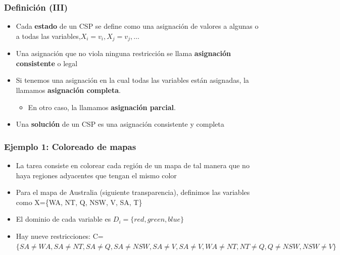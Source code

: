 \documentclass[xcolor=table]{beamer}
\begin{document}
\begin{frame}  \frametitle{Definición (III)} \footnotesize

\begin{itemize}
\item Cada \textbf{estado} de un CSP se define como una asignación de valores a algunas o a todas las variables,$ {X_i=v_i, X_j=v_j,\ldots }$

\item Una asignación que no viola ninguna restricción se llama \textbf{asignación consistente} o legal


\item Si tenemos una asignación en la cual todas las variables están asignadas, la llamamos \textbf{asignación completa}. 
\begin{itemize}
\item En otro caso, la llamamos \textbf{asignación parcial}.
\end{itemize}

\item Una \textbf{solución} de un CSP es una asignación consistente y completa



\end{itemize}

\end{frame} 


\begin{frame}  \frametitle{Ejemplo 1: Coloreado de mapas} \footnotesize

\begin{itemize}



\item La tarea consiste en colorear cada región de un mapa de tal manera que no haya regiones adyacentes que tengan el mismo color
\item Para el mapa de Australia (siguiente transparencia), definimos las variables como X=\{WA, NT, Q, NSW, V, SA, T\}
\item El dominio de cada variable es $D_i=\{red, green, blue\}$
\item Hay nueve restricciones: C=$\{SA \neq WA, SA \neq NT, SA\neq Q, SA \neq NSW, SA \neq V , SA\neq V, WA\neq NT , NT \neq Q, Q \neq NSW, NSW \neq V\}$


\end{itemize}

\end{frame} 
\end{document}
